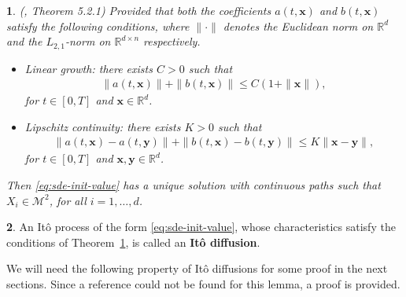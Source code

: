 \documentclass[english]{article}
\numberwithin{equation}{section}
\numberwithin{figure}{section}
\theoremstyle{bolddescit}
\newtheorem{theorem}{\protect\theoremname}[section]
\theoremstyle{definition}
\newtheorem{definition}[theorem]{\protect\definitionname}
\theoremstyle{definition}
\theoremstyle{plain}
\theoremstyle{plain}
\theoremstyle{bolddesc}
\theoremstyle{plain}
\theoremstyle{remark}
\providecommand{\definitionname}{Definition}
\providecommand{\theoremname}{Theorem}
\begin{document}
\begin{theorem}\label{thm:sde-solution}
  (\cite{oksendal_stochastic_2003}, Theorem 5.2.1)
  Provided that both the coefficients $a(t,\mathbf{x})$ and $b(t,\mathbf{x})$ satisfy the following conditions, where $\|\cdot\|$ denotes the Euclidean norm on $\mathbb{R}^d$ and the $L_{2,1}$-norm on $\mathbb{R}^{d \times n}$ respectively.
  \begin{itemize}
    \item Linear growth: there exists $C > 0$ such that
      \begin{align*}
        \|a(t,\mathbf{x})\| + \|b(t,\mathbf{x})\| \le C (1 + \|\mathbf{x}\|),
      \end{align*}
      for $t \in [0,T]$ and $\mathbf{x} \in \mathbb{R}^d$.
    \item Lipschitz continuity: there exists $K > 0$ such that
      \begin{align*}
        \|a(t,\mathbf{x}) - a(t,\mathbf{y})\| + \|b(t,\mathbf{x}) - b(t,\mathbf{y})\| \le K \|\mathbf{x}-\mathbf{y}\|,
      \end{align*}
      for $t \in [0,T]$ and $\mathbf{x},\mathbf{y} \in \mathbb{R}^d$.
  \end{itemize}
  Then \eqref{eq:sde-init-value} has a unique solution with continuous paths such that $X_i \in \mathcal{M}^2$, for all $i=1,\ldots,d$.
\end{theorem}

\begin{definition}\label{def:ito-diffusion}
  An It\^o process of the form \eqref{eq:sde-init-value}, whose characteristics satisfy the conditions of Theorem~\ref{thm:sde-solution}, is called an \textbf{It\^o diffusion}.
\end{definition}

We will need the following property of It\^o diffusions for some proof in the next sections. Since a reference could not be found for this lemma, a proof is provided.
\end{document}

